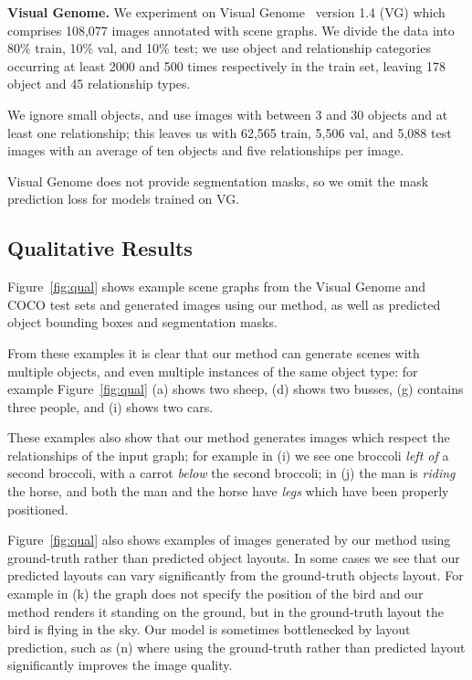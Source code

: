 \documentclass[10pt,twocolumn,letterpaper]{article}
\begin{document}
\textbf{Visual Genome.}
We experiment on Visual Genome~\cite{krishna2017visual} version 1.4 (VG) which
comprises 108,077 images annotated with scene graphs. We divide the data into
80\% train, 10\% val, and 10\% test; we use object and relationship categories
occurring at least 2000 and 500 times respectively in the train set, leaving
178 object and 45 relationship types.

We ignore small objects,
and use images with between 3 and 30 objects and at
least one relationship; this leaves us with 62,565 train, 5,506 val, and 5,088
test images with an average of ten objects and five relationships per image.

Visual Genome does not provide segmentation masks, so we omit the
mask prediction loss for models trained on VG.

\subsection{Qualitative Results}
Figure~\ref{fig:qual} shows example scene graphs from the Visual Genome and COCO
test sets and generated images using our method, as well as predicted object
bounding boxes and segmentation masks.

From these examples it is clear that our method can generate scenes with multiple
objects, and even multiple instances of the same object type: for example Figure~\ref{fig:qual} (a) shows two sheep, (d) shows two busses, (g) contains three 
people, and (i) shows two cars.

These examples also show that our method generates images which respect the
relationships of the input graph; for example in (i) we see one broccoli 
\emph{left of} a second broccoli, with a carrot \emph{below} the second broccoli; 
in (j) the man is \emph{riding} the horse, and both the man and the horse have
\emph{legs} which have been properly positioned.

Figure~\ref{fig:qual} also shows examples of images generated by our method
using ground-truth rather than predicted object layouts. In some cases we see
that our predicted layouts can vary significantly from the ground-truth objects
layout. For example in (k) the graph does not specify the position of the bird
and our method renders it standing on the ground, but in the ground-truth layout 
the bird is flying in the sky. Our model is sometimes bottlenecked by layout
prediction, such as (n) where using the ground-truth rather than predicted
layout significantly improves the image quality.
\end{document}
